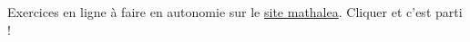 \begin{mathalea}[][\mathaleaLogo]
    Exercices en ligne à faire en autonomie sur le \href{https://coopmaths.fr/mathalea.html}{site mathalea}. 
    Cliquer et c'est parti !
    \begin{itemize}
        \begin{spacing}{3}
            \item {}
        \end{spacing}
    \end{itemize}
\end{mathalea}